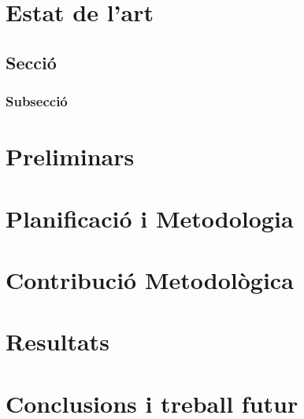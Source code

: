 \documentclass[a4paper,12pt,twoside]{ThesisStyle}
\begin{document}
\chapter{Estat de l'art}
\label{cap:estat}

\section{Secció}

\subsection{Subsecció}

\chapter{Preliminars}
\label{cap:prelim}

\chapter{Planificació i Metodologia}
\label{cap:plan}

\chapter{Contribució Metodològica}
\label{cap:contrib}

\chapter{Resultats}
\label{cap:result}

\chapter{Conclusions i treball futur}
\label{cap:concl}

\backmatter


%

% 



\end{document}
